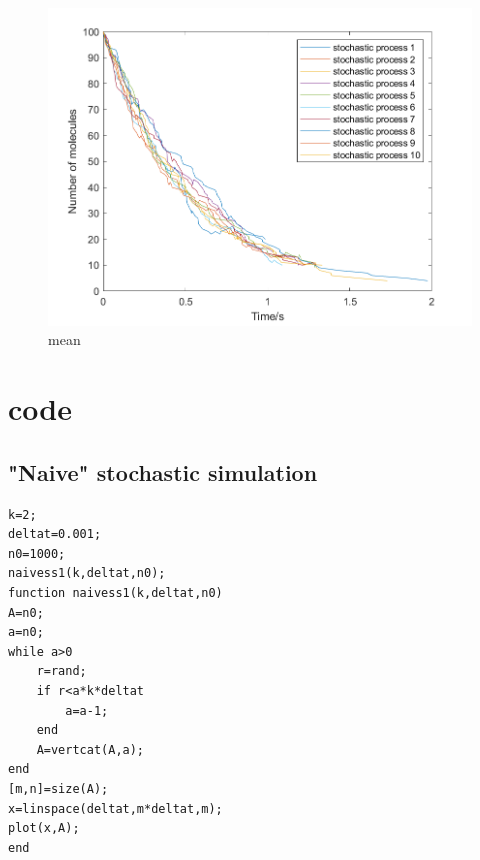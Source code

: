 \documentclass{article}
\begin{document}
\begin{figure}[htbp]
\centering
\includegraphics[width=\linewidth]{graph/mean2.png}
\caption{mean}
\end{figure}
\clearpage









\section{code}
\subsection{"Naive" stochastic simulation}
\begin{lstlisting}
k=2;
deltat=0.001;
n0=1000;
naivess1(k,deltat,n0);
function naivess1(k,deltat,n0)
A=n0;
a=n0;
while a>0
    r=rand;
    if r<a*k*deltat
        a=a-1;
    end
    A=vertcat(A,a);
end
[m,n]=size(A);
x=linspace(deltat,m*deltat,m);
plot(x,A);
end
\end{lstlisting}
\end{document}

